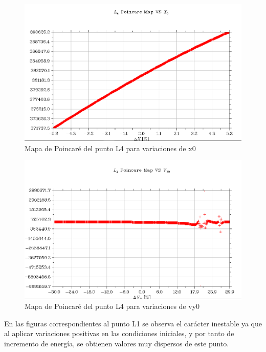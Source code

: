 \documentclass{article}
\begin{document}
	\newpage

	\begin{figure}[h!]
		\begin{center}
			\includegraphics[scale=0.45]{p3.png}
			\caption{Mapa de Poincaré del punto L4 para variaciones de x0}
		\end{center}
	\end{figure}

	\begin{figure}[h!]
		\begin{center}
			\includegraphics[scale=0.45]{p4.png}
			\caption{Mapa de Poincaré del punto L4 para variaciones de vy0}
		\end{center}
	\end{figure}
	
	En las figuras correspondientes al punto L1 se observa el carácter inestable ya que al aplicar variaciones positivas en las condiciones iniciales, y por tanto de incremento de energía, se obtienen valores muy dispersos de este punto.
	
\end{document}
